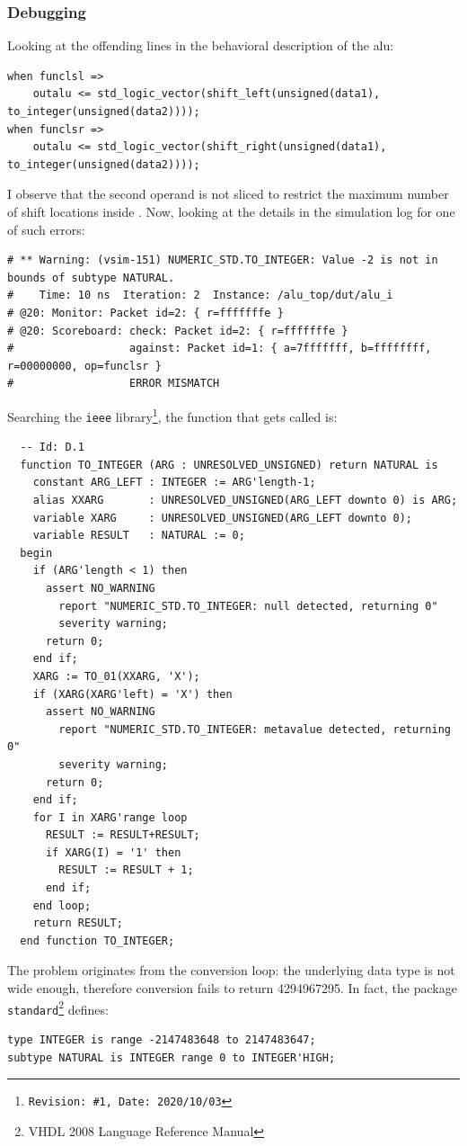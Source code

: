 \subsubsection{Debugging}
Looking at the offending lines in the behavioral description of the \ac{alu}:
\begin{verbatim} 
when funclsl =>
    outalu <= std_logic_vector(shift_left(unsigned(data1), to_integer(unsigned(data2))));
when funclsr =>
    outalu <= std_logic_vector(shift_right(unsigned(data1), to_integer(unsigned(data2))));
\end{verbatim}
I observe that the second operand is not sliced to restrict the maximum number of shift locations inside . Now, looking at the details in the simulation log for one of such errors:
\begin{verbatim} 
# ** Warning: (vsim-151) NUMERIC_STD.TO_INTEGER: Value -2 is not in bounds of subtype NATURAL.
#    Time: 10 ns  Iteration: 2  Instance: /alu_top/dut/alu_i
# @20: Monitor: Packet id=2: { r=fffffffe }
# @20: Scoreboard: check: Packet id=2: { r=fffffffe }
#                  against: Packet id=1: { a=7fffffff, b=ffffffff, r=00000000, op=funclsr }
#                  ERROR MISMATCH
\end{verbatim}
Searching the \texttt{ieee} library\footnote{\texttt{Revision: \#1, Date: 2020/10/03}}, the function that gets called is:
\begin{verbatim} 
  -- Id: D.1
  function TO_INTEGER (ARG : UNRESOLVED_UNSIGNED) return NATURAL is
    constant ARG_LEFT : INTEGER := ARG'length-1;
    alias XXARG       : UNRESOLVED_UNSIGNED(ARG_LEFT downto 0) is ARG;
    variable XARG     : UNRESOLVED_UNSIGNED(ARG_LEFT downto 0);
    variable RESULT   : NATURAL := 0;
  begin
    if (ARG'length < 1) then
      assert NO_WARNING
        report "NUMERIC_STD.TO_INTEGER: null detected, returning 0"
        severity warning;
      return 0;
    end if;
    XARG := TO_01(XXARG, 'X');
    if (XARG(XARG'left) = 'X') then
      assert NO_WARNING
        report "NUMERIC_STD.TO_INTEGER: metavalue detected, returning 0"
        severity warning;
      return 0;
    end if;
    for I in XARG'range loop
      RESULT := RESULT+RESULT;
      if XARG(I) = '1' then
        RESULT := RESULT + 1;
      end if;
    end loop;
    return RESULT;
  end function TO_INTEGER;
\end{verbatim}
The problem originates from the conversion loop: the underlying data type is not wide enough, therefore  conversion fails to return \num{4294967295}. In fact, the package \texttt{standard}\footnote{VHDL 2008 Language Reference Manual} defines:
\begin{verbatim} 
type INTEGER is range -2147483648 to 2147483647;
subtype NATURAL is INTEGER range 0 to INTEGER'HIGH;
\end{verbatim}

